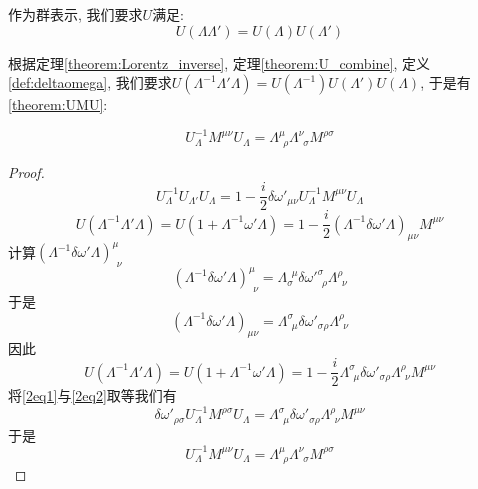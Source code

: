 \begin{theorem}[结合律]\label{theorem:U_combine}
    作为群表示, 我们要求$U$满足:
    \begin{equation}
        U(\Lambda\Lambda')=U(\Lambda)U(\Lambda')
    \end{equation}
\end{theorem}
根据定理\ref{theorem:Lorentz_inverse}, 定理\ref{theorem:U_combine}, 定义\ref{def:deltaomega}, 我们要求$U(\Lambda^{-1}\Lambda'\Lambda)=U(\Lambda^{-1})U(\Lambda')U(\Lambda)$, 于是有\ref{theorem:UMU}:
\begin{theorem}\label{theorem:UMU}
    \begin{equation}
        U^{-1}_\Lambda M^{\mu\nu}U_\Lambda=\Lambda^\mu_{~~\rho}\Lambda^\nu_{~~\sigma}M^{\rho\sigma}
    \end{equation}
\end{theorem}
\begin{proof}
    \begin{equation}\label{2eq1}
        U_\Lambda^{-1}U_{\Lambda'}U_\Lambda=1-\frac i2\delta{\omega'}_{\mu\nu}U_\Lambda^{-1}M^{\mu\nu}U_\Lambda
    \end{equation}
    \begin{equation}
        U(\Lambda^{-1}\Lambda'\Lambda)=U(1+\Lambda^{-1}\omega'\Lambda)=1-\frac i2(\Lambda^{-1}\delta\omega'\Lambda)_{\mu\nu}M^{\mu\nu}
    \end{equation}
    计算$(\Lambda^{-1}\delta\omega'\Lambda)^{\mu}_{~~\nu}$
    \begin{equation}
        (\Lambda^{-1}\delta\omega'\Lambda)^{\mu}_{~~\nu}=\Lambda_\sigma^{~~\mu}\delta{\omega'}^\sigma_{~~\rho}\Lambda^\rho_{~~\nu}
    \end{equation}
    于是
    \begin{equation}
        (\Lambda^{-1}\delta\omega'\Lambda)_{\mu\nu}=\Lambda^{\sigma}_{~~\mu}\delta{\omega'}_{\sigma\rho}\Lambda^\rho_{~~\nu}
    \end{equation}
    因此
    \begin{equation}\label{2eq2}
        U(\Lambda^{-1}\Lambda'\Lambda)=U(1+\Lambda^{-1}\omega'\Lambda)=1-\frac i2\Lambda^{\sigma}_{~~\mu}\delta{\omega'}_{\sigma\rho}\Lambda^\rho_{~~\nu}M^{\mu\nu}
    \end{equation}
    将\eqref{2eq1}与\eqref{2eq2}取等我们有
    \begin{equation}
        \delta{\omega'}_{\rho\sigma}U_\Lambda^{-1}M^{\rho\sigma}U_\Lambda=\Lambda^{\sigma}_{~~\mu}\delta{\omega'}_{\sigma\rho}\Lambda^\rho_{~~\nu}M^{\mu\nu}
    \end{equation}
    于是
    \begin{equation}
        U^{-1}_\Lambda M^{\mu\nu}U_\Lambda=\Lambda^\mu_{~~\rho}\Lambda^\nu_{~~\sigma}M^{\rho\sigma}
    \end{equation}
\end{proof}
